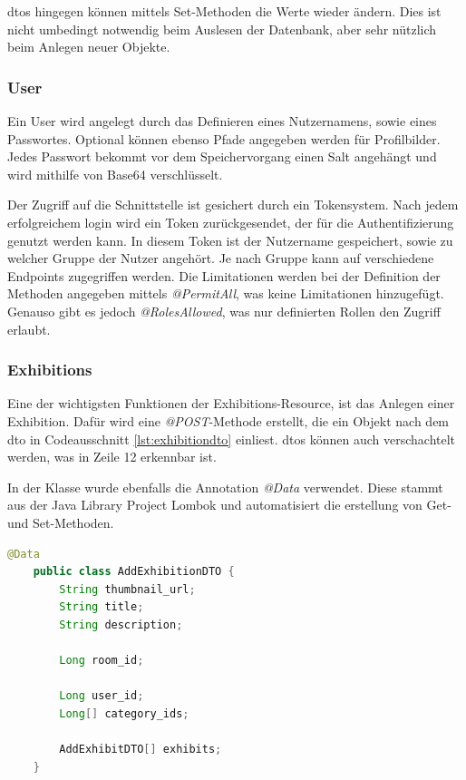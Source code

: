 \gls{dto}s hingegen können mittels Set-Methoden die Werte wieder ändern.
Dies ist nicht umbedingt notwendig beim Auslesen der Datenbank, aber sehr nützlich beim Anlegen neuer Objekte. 

\subsubsection{User}
Ein User wird angelegt durch das Definieren eines Nutzernamens, sowie eines Passwortes. 
Optional können ebenso Pfade angegeben werden für Profilbilder. 
Jedes Passwort bekommt vor dem Speichervorgang einen Salt angehängt und wird mithilfe von Base64 verschlüsselt. 

Der Zugriff auf die Schnittstelle ist gesichert durch ein Tokensystem. 
Nach jedem erfolgreichem login wird ein Token zurückgesendet, der für die Authentifizierung genutzt werden kann. 
In diesem Token ist der Nutzername gespeichert, sowie zu welcher Gruppe der Nutzer angehört. 
Je nach Gruppe kann auf verschiedene Endpoints zugegriffen werden. 
Die Limitationen werden bei der Definition der Methoden angegeben mittels \emph{@PermitAll}, was keine Limitationen hinzugefügt.
Genauso gibt es jedoch \emph{@RolesAllowed}, was nur definierten Rollen den Zugriff erlaubt.  


\subsubsection{Exhibitions}
Eine der wichtigsten Funktionen der Exhibitions-Resource, ist das Anlegen einer Exhibition. 
Dafür wird eine \emph{@POST}-Methode erstellt, die ein Objekt nach dem \gls{dto} in Codeausschnitt \ref{lst:exhibitiondto} einliest.
\gls{dto}s können auch verschachtelt werden, was in Zeile 12 erkennbar ist. 

In der Klasse wurde ebenfalls die Annotation \emph{@Data} verwendet. 
Diese stammt aus der Java Library Project Lombok und automatisiert die erstellung von Get- und Set-Methoden. 
\cite{Lambok}

\begin{lstlisting}[label=lst:exhibitiondto, language=Java, caption=Exhibition DTO]
    @Data
    public class AddExhibitionDTO {
        String thumbnail_url;
        String title;
        String description;

        Long room_id;

        Long user_id;
        Long[] category_ids;

        AddExhibitDTO[] exhibits;
    }
\end{lstlisting}

